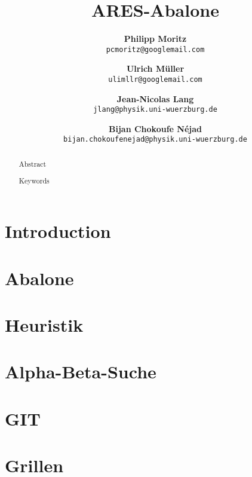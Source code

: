 \documentclass[a4paper,twoside]{article}
\title{{\sc ARES-Abalone}}
\author{
{
\small \bf Philipp Moritz}\\
 \small\texttt{pcmoritz@googlemail.com} 
  \and
 {\small \bf Ulrich Müller} \\ 
 \small \texttt{ulimllr@googlemail.com}
	\and
  {\small \bf Jean-Nicolas Lang}\\
  \small\texttt{jlang@physik.uni-wuerzburg.de}
  \and
  {\small \bf Bijan Chokoufe Néjad}\\
  \small\texttt{bijan.chokoufenejad@physik.uni-wuerzburg.de}
}
\date{}
\begin{document}
\renewcommand{\bibsection}{\section*{References}}

\maketitle

\begin{abstract}
  Abstract
    
\bigskip

 Keywords
\bigskip

\end{abstract}
\section{Introduction}


\section{Abalone}


\section{Heuristik}


\section{Alpha-Beta-Suche}


\section{GIT}


\section{Grillen}





\end{document}
